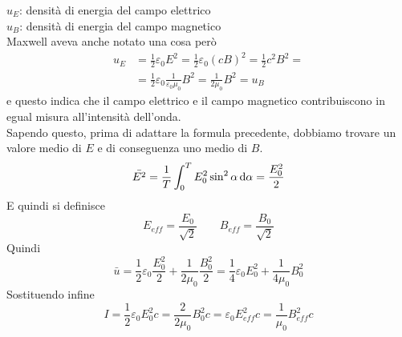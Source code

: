 $u_E$: densità di energia del campo elettrico\\
$u_B$: densità di energia del campo magnetico\\ [\baselineskip]
Maxwell aveva anche notato una cosa però
\begin{align*}
  u_E &= \frac{1}{2}\varepsilon_0E^2=\frac{1}{2}\varepsilon_0(cB)^2=\frac{1}{2}c^2B^2=\\
      &= \frac{1}{2}\varepsilon_0 \frac{1}{\varepsilon_0\mu_0}B^2= \frac{1}{2\mu_0}B^2=u_B
\end{align*}
e questo indica che il campo elettrico e il campo magnetico contribuiscono in egual misura
all'intensità dell'onda.\\
Sapendo questo, prima di adattare la formula precedente, dobbiamo trovare un valore medio di $E$
e di conseguenza uno medio di $B$.
\begin{equation*}
  \bar{E^2}=\frac{1}{T}\int_0^T E_0^2\sin^2\alpha\mathop{}\!\mathrm{d}\alpha=\frac{E_0^2}{2}
\end{equation*}
E quindi si definisce
\begin{equation*}
  E_{eff} = \frac{E_0}{\sqrt{2}} \qquad B_{eff} = \frac{B_0}{\sqrt{2}}
\end{equation*}
Quindi
\begin{equation*}
  \bar{u}=\frac{1}{2}\varepsilon_0 \frac{E_0^2}{2}+\frac{1}{2\mu_0}\frac{B_0^2}{2}=
  \frac{1}{4}\varepsilon_0E_0^2+\frac{1}{4\mu_0}B_0^2
\end{equation*}
Sostituendo infine
\begin{equation*}
  I=\frac{1}{2}\varepsilon_0E_0^2c=\frac{2}{2\mu_0}B_0^2c=\varepsilon_0E_{eff}^2c=\frac{1}{\mu_0}
  B_{eff}^2c
\end{equation*}
